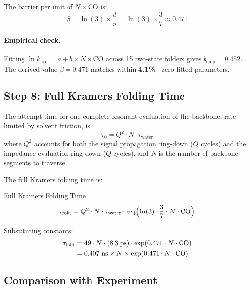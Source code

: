 The barrier per unit of $N \times \text{CO}$ is:
\begin{equation}
    \beta = \ln(3) \times \frac{d}{n} = \ln(3) \times \frac{3}{7} \approx 0.471
    \label{eq:beta_barrier}
\end{equation}

\paragraph{Empirical check.}
Fitting $\ln k_\text{fold} = a + b \times N \times \text{CO}$ across 15 two-state folders gives $b_\text{emp} = 0.452$.
The derived value $\beta = 0.471$ matches within \textbf{4.1\%}---zero fitted parameters.

\subsection{Step 8: Full Kramers Folding Time}
\label{sec:kramers_fold}

The attempt time for one complete resonant evaluation of the backbone, rate-limited by solvent friction, is:
\begin{equation}
    \tau_0 = Q^2 \cdot N \cdot \tau_\text{water}
    \label{eq:tau_attempt}
\end{equation}
where $Q^2$ accounts for both the signal propagation ring-down ($Q$ cycles) and the impedance evaluation ring-down ($Q$ cycles), and $N$ is the number of backbone segments to traverse.

The full Kramers folding time is:
\begin{resultbox}{Full Kramers Folding Time}
\begin{equation}
    \tau_\text{fold} = Q^2 \cdot N \cdot \tau_\text{water} \cdot \exp\!\Bigl(\ln(3) \cdot \frac{3}{7} \cdot N \cdot \text{CO}\Bigr)
    \label{eq:tau_fold}
\end{equation}
\end{resultbox}
Substituting constants:
\begin{align}
    \tau_\text{fold} &= 49 \cdot N \cdot (8.3\;\text{ps}) \cdot \exp(0.471 \cdot N \cdot \text{CO}) \notag \\
    &= 0.407\;\text{ns} \times N \times \exp(0.471 \cdot N \cdot \text{CO})
    \label{eq:tau_fold_num}
\end{align}

\subsection{Comparison with Experiment}
\label{sec:tau_comparison}

